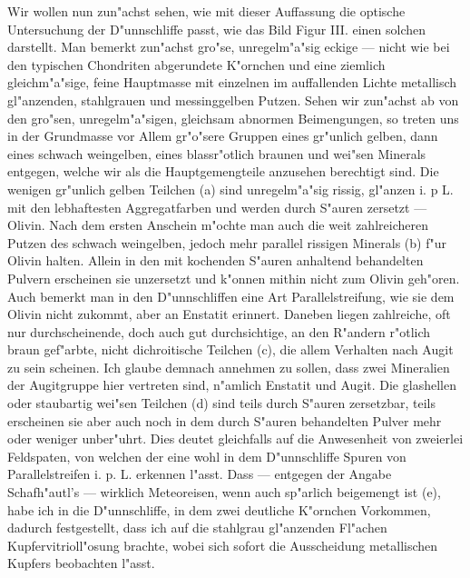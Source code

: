 \documentclass[a4paper, 11pt, oneside]{article}
\begin{document}
Wir wollen nun zun"achst sehen, wie mit dieser Auffassung die optische Untersuchung der D"unnschliffe passt, wie das Bild Figur III. einen solchen darstellt. Man bemerkt zun"achst gro"se, unregelm"a"sig eckige --- nicht wie bei den typischen Chondriten abgerundete K"ornchen und eine ziemlich gleichm"a"sige, feine Hauptmasse mit einzelnen im auffallenden Lichte metallisch gl"anzenden, stahlgrauen und messinggelben Putzen. Sehen wir zun"achst ab von den gro"sen, unregelm"a"sigen, gleichsam abnormen Beimengungen, so treten uns in der Grundmasse vor Allem gr"o"sere Gruppen eines gr"unlich gelben, dann eines schwach weingelben, eines blassr"otlich braunen und wei"sen Minerals entgegen, welche wir als die Hauptgemengteile anzusehen berechtigt sind. Die wenigen gr"unlich gelben Teilchen (a) sind unregelm"a"sig rissig, gl"anzen i. p L. mit den lebhaftesten Aggregatfarben und werden durch S"auren zersetzt --- Olivin. Nach dem ersten Anschein m"ochte man auch die weit zahlreicheren Putzen des schwach weingelben, jedoch mehr parallel rissigen Minerals (b) f"ur Olivin halten. Allein in den mit kochenden S"auren anhaltend behandelten Pulvern erscheinen sie unzersetzt und k"onnen mithin nicht zum Olivin geh"oren. Auch bemerkt man in den D"unnschliffen eine Art Parallelstreifung, wie sie dem Olivin nicht zukommt, aber an Enstatit erinnert. Daneben liegen zahlreiche, oft nur durchscheinende, doch auch gut durchsichtige, an den R"andern r"otlich braun gef"arbte, nicht dichroitische Teilchen (c), die allem Verhalten nach Augit zu sein scheinen. Ich glaube demnach annehmen zu sollen, dass zwei Mineralien der Augitgruppe hier vertreten sind, n"amlich Enstatit und Augit. Die glashellen oder staubartig wei"sen Teilchen (d) sind teils durch S"auren zersetzbar, teils erscheinen sie aber auch noch in dem durch S"auren behandelten Pulver mehr oder weniger unber"uhrt. Dies deutet gleichfalls auf die Anwesenheit von zweierlei Feldspaten, von welchen der eine wohl in dem D"unnschliffe Spuren von Parallelstreifen i. p. L. erkennen l"asst. Dass --- entgegen der Angabe Schafh"autl's --- wirklich Meteoreisen, wenn auch sp"arlich beigemengt ist (e), habe ich in die D"unnschliffe, in dem zwei deutliche K"ornchen Vorkommen, dadurch festgestellt, dass ich auf die stahlgrau gl"anzenden Fl"achen Kupfervitrioll"osung brachte, wobei sich sofort die Ausscheidung metallischen Kupfers beobachten l"asst.
\end{document}
